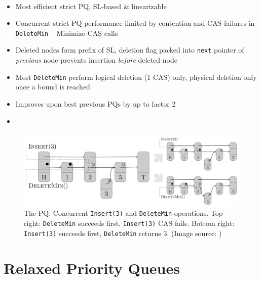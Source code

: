 \documentclass[usenames,dvipsnames]{beamer}
\begin{document}
\begin{frame}{}
\framesubtitle{\citeauthor{linden2013skiplist}}

\begin{itemize}
\item Most efficient strict \ac{PQ}, \ac{SL}-based \& linearizable
\item Concurrent strict \ac{PQ} performance limited by contention and \ac{CAS} failures in
      \lstinline|DeleteMin| \textrightarrow ~ Minimize \ac{CAS} calls
\item Deleted nodes form prefix of \ac{SL}, deletion flag packed into \lstinline|next| pointer of
      \emph{previous} node prevents insertion \emph{before} deleted node
\item Most \lstinline|DeleteMin| perform logical deletion (1 \ac{CAS}) only, physical deletion
      only once a bound is reached
\item Improves upon best previous \acp{PQ} by up to factor 2
\item {}
\end{itemize}
\end{frame}

\begin{frame}{}
\framesubtitle{\citeauthor{linden2013skiplist}}

\begin{figure}
\includegraphics[width=\textwidth]{linden}
\caption{The \citeauthor{linden2013skiplist} \ac{PQ}. Concurrent \lstinline|Insert(3)| and
\lstinline|DeleteMin| operations. Top right: \lstinline|DeleteMin| succeeds first,
\lstinline|Insert(3)| \ac{CAS} fails. Bottom right: \lstinline|Insert(3)| succeeds first,
\lstinline|DeleteMin| returns 3. (Image source: \cite{linden2013skiplist})}
\end{figure}
\end{frame}

\section{Relaxed Priority Queues} \label{sec:relaxed}
\end{document}
